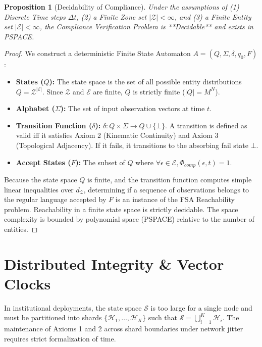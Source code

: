 \documentclass[conference]{IEEEtran}
\newtheorem{proposition}{Proposition}
\newcommand{\E}{\mathcal{E}} %
\newcommand{\Z}{\mathcal{Z}} %
\newcommand{\Sstate}{\mathcal{S}} %
\newcommand{\fail}{\bot} %
\begin{document}
\begin{proposition}[Decidability of Compliance]
Under the assumptions of (1) Discrete Time steps $\Delta t$, (2) a Finite Zone set $|\Z| < \infty$, and (3) a Finite Entity set $|\E| < \infty$, the Compliance Verification Problem is **Decidable** and exists in PSPACE.
\end{proposition}

\begin{proof}
We construct a deterministic Finite State Automaton $A = (Q, \Sigma, \delta, q_0, F)$:
\begin{itemize}
    \item \textbf{States ($Q$):} The state space is the set of all possible entity distributions $Q = \Z^{|\E|}$. Since $\Z$ and $\E$ are finite, $Q$ is strictly finite ($|Q| = M^N$).
    \item \textbf{Alphabet ($\Sigma$):} The set of input observation vectors at time $t$.
    \item \textbf{Transition Function ($\delta$):} $\delta: Q \times \Sigma \to Q \cup \{\fail\}$. A transition is defined as valid iff it satisfies Axiom 2 (Kinematic Continuity) and Axiom 3 (Topological Adjacency). If it fails, it transitions to the absorbing fail state $\fail$.
    \item \textbf{Accept States ($F$):} The subset of $Q$ where $\forall \epsilon \in \E, \Phi_{comp}(\epsilon, t) = 1$.
\end{itemize}
Because the state space $Q$ is finite, and the transition function computes simple linear inequalities over $d_\Z$, determining if a sequence of observations belongs to the regular language accepted by $F$ is an instance of the FSA Reachability problem. Reachability in a finite state space is strictly decidable. The space complexity is bounded by polynomial space (PSPACE) relative to the number of entities.
\end{proof}

\section{Distributed Integrity \& Vector Clocks}

In institutional deployments, the state space $\Sstate$ is too large for a single node and must be partitioned into shards $\{\mathcal{H}_1, \dots, \mathcal{H}_K\}$ such that $\Sstate = \bigcup_{i=1}^K \mathcal{H}_i$. The maintenance of Axioms 1 and 2 across shard boundaries under network jitter requires strict formalization of time.
\end{document}
